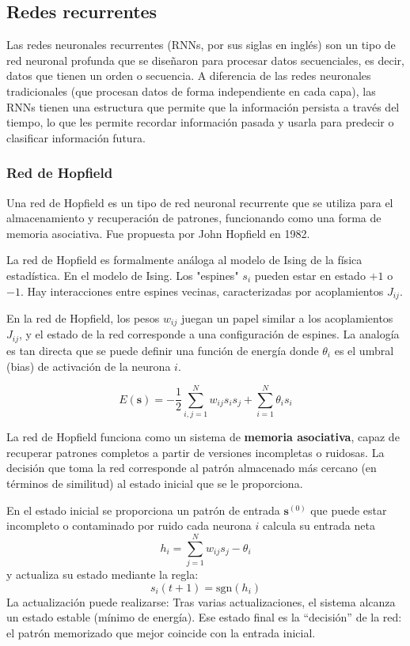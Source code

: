 \subsection{Redes recurrentes}

Las redes neuronales recurrentes (RNNs, por sus siglas en inglés) son un tipo de red neuronal profunda que se diseñaron para procesar datos secuenciales, es decir, datos que tienen un orden o secuencia. A diferencia de las redes neuronales tradicionales (que procesan datos de forma independiente en cada capa), las RNNs tienen una estructura que permite que la información persista a través del tiempo, lo que les permite recordar información pasada y usarla para predecir o clasificar información futura.

\subsubsection{Red de Hopfield}

Una red de Hopfield es un tipo de red neuronal recurrente que se utiliza para el almacenamiento y recuperación de patrones, funcionando como una forma de memoria asociativa. Fue propuesta por John Hopfield en 1982.

La red de Hopfield es formalmente análoga al modelo de Ising de la física estadística. En el modelo de Ising. Los "espines" $s_i$ pueden estar en estado $+1$ o $-1$. Hay interacciones entre espines vecinas, caracterizadas por acoplamientos $J_{ij}$.

En la red de Hopfield, los pesos $w_{ij}$ juegan un papel similar a los acoplamientos $J_{ij}$, y el estado de la red corresponde a una configuración de espines. La analogía es tan directa que se puede definir una función de energía donde $\theta_i$ es el umbral (bias) de activación de la neurona $i$.

\begin{equation}
E(\mathbf{s}) = -\frac{1}{2} \sum_{i,j=1}^{N} w_{ij} s_i s_j + \sum_{i=1}^{N} \theta_i s_i
\end{equation}

La red de Hopfield funciona como un sistema de \textbf{memoria asociativa}, capaz de recuperar patrones completos a partir de versiones incompletas o ruidosas. La decisión que toma la red corresponde al patrón almacenado más cercano (en términos de similitud) al estado inicial que se le proporciona.

En el estado inicial se proporciona un patrón de entrada $\mathbf{s}^{(0)}$ que puede estar incompleto o contaminado por ruido cada neurona $i$ calcula su entrada neta \[
    h_i = \sum_{j=1}^{N} w_{ij} s_j - \theta_i
    \] y actualiza su estado mediante la regla: \[
    s_i(t+1) = \text{sgn}(h_i)
    \] La actualización puede realizarse: Tras varias actualizaciones, el sistema alcanza un estado estable (mínimo de energía). Ese estado final es la ``decisión'' de la red: el patrón memorizado que mejor coincide con la entrada inicial.

